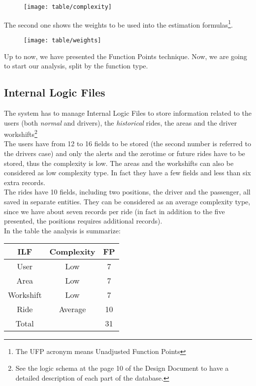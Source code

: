 \documentclass[\mainpath/main]{subfiles}
\begin{document}
\begin{figure} [!ht]
	\centering
	\texttt{[image: table/complexity]}
\end{figure}

The second one shows the weights to be used into the estimation formulas\footnote{The UFP acronym means Unadjusted Function Points}.

\begin{figure}[!ht]
	\centering
	\texttt{[image: table/weights]}
\end{figure}

\clearpage

Up to now, we have presented the Function Points technique. Now, we are going to start our analysis, split by the function type.

\subsection{Internal Logic Files}
The system has to manage Internal Logic Files to store information related to the users (both \textit{normal} and drivers), the \textit{historical} rides, the areas and the driver workshifts\footnote{See the logic schema at the page 10 of the Design Document to have a detailed description of each part of the database.}\\
The users have from 12 to 16 fields to be stored (the second number is referred to the drivers case) and only the alerts and the zerotime or future rides have to be stored, thus the complexity is low. The areas and the workshifts can also be considered as low complexity type. In fact they have a few fields and less than six extra records.\\
The rides have 10 fields, including two positions, the driver and the passenger, all saved in separate entities. They can be considered as an average complexity type, since we have about seven records per ride (in fact in addition to the five presented, the positions requires additional records).\\
In the table the analysis is summarize:
\begin{tabular}{ccc}
	\hline ILF & Complexity & FP \\
	\hline User & Low & 7 \\
				Area & Low & 7 \\
				Workshift & Low & 7 \\
				Ride & Average & 10 \\
	\hline Total & & 31
\end{tabular}
\end{document}
